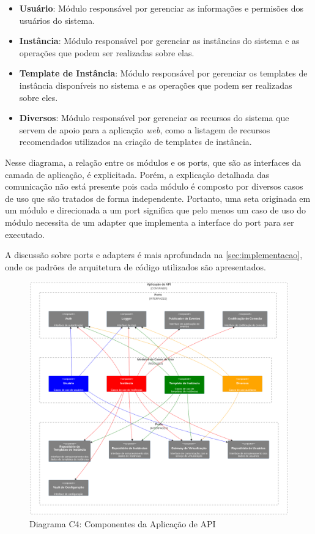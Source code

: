 \begin{itemize}
    \item \textbf{Usuário}: Módulo responsável por gerenciar as informações e permisões dos usuários do sistema.

    \item \textbf{Instância}: Módulo responsável por gerenciar as instâncias do sistema e as operações que podem ser realizadas sobre elas.

    \item \textbf{Template de Instância}: Módulo responsável por gerenciar os templates de instância disponíveis no sistema e as operações que podem ser realizadas sobre eles.

    \item \textbf{Diversos}: Módulo responsável por gerenciar os recursos do sistema que servem de apoio para a aplicação \textit{web}, como a listagem de recursos recomendados utilizados na criação de templates de instância.

\end{itemize}

Nesse diagrama, a relação entre os módulos e os \glspl{port}, que são as interfaces da camada de aplicação, é explicitada. Porém, a explicação detalhada das comunicação não está presente pois cada módulo é composto por diversos casos de uso que são tratados de forma independente. Portanto, uma seta originada em um módulo e direcionada a um \gls{port} significa que pelo menos um caso de uso do módulo necessita de um \gls{adapter} que implementa a interface do \gls{port} para ser executado. 

A discussão sobre \glspl{port} e \glspl{adapter} é mais aprofundada na \autoref{sec:implementacao},
onde os padrões de arquitetura de código utilizados são apresentados.

\begin{figure}[H]
\caption{Diagrama C4: Componentes da Aplicação de API}
\label{fig:diagramaC4ComponentesDaAPI}
\includegraphics[width=\textwidth]{capitulos/2-metodologia/files/c4-component-api.png}
\end{figure}

